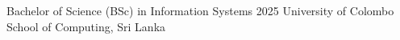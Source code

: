 

\educationHeading
{Bachelor of Science (BSc) in Information Systems}
{2025}
{University of Colombo School of Computing, Sri Lanka}